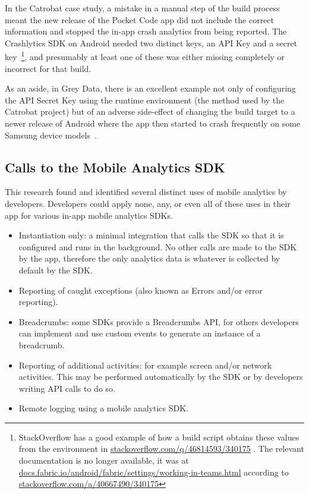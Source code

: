 In the Catrobat case study, a mistake in a manual step of the build process meant the new release of the Pocket Code app did not include the correct information and stopped the in-app crash analytics from being reported. The Crashlytics SDK on Android needed two distinct keys, an API Key and a secret key~\footnote{StackOverflow has a good example of how a build script obtains these values from the environment in \href{https://stackoverflow.com/q/46814593/340175}{stackoverflow.com/q/46814593/340175}%
. 
The relevant documentation is no longer available, it was at \href{https://docs.fabric.io/android/fabric/settings/working-in-teams.html}{docs.fabric.io/android/fabric/settings/working-in-teams.html} according to \href{https://stackoverflow.com/a/40667490/340175}{stackoverflow.com/a/40667490/340175}}, and presumably at least one of these was either missing completely or incorrect for that build.

As an aside, in Grey Data, there is an excellent example not only of configuring the API Secret Key using the runtime environment (the method used by the Catrobat project) but of an adverse side-effect of changing the build target to a newer release of Android where the app then started to crash frequently on some Samsung device models~. 


\subsection{Calls to the Mobile Analytics SDK}
This research found and identified several distinct uses of mobile analytics by developers. Developers could apply none, any, or even all of these uses in their app for various in-app mobile analytics SDKs.

\begin{itemize}
    \item Instantiation only: a minimal integration that calls the SDK so that it is configured and runs in the background. No other calls are made to the SDK by the app, therefore the only analytics data is whatever is collected by default by the SDK.
    \item Reporting of caught exceptions (also known as Errors and/or error reporting). 
    \item Breadcrumbs: some SDKs provide a Breadcrumbs API, for others developers can implement and use custom events to generate an instance of a breadcrumb.
    \item Reporting of additional activities: for example screen and/or network activities. This may be performed automatically by the SDK or by developers writing API calls to do so.
    \item Remote logging using a mobile analytics SDK.
\end{itemize}

